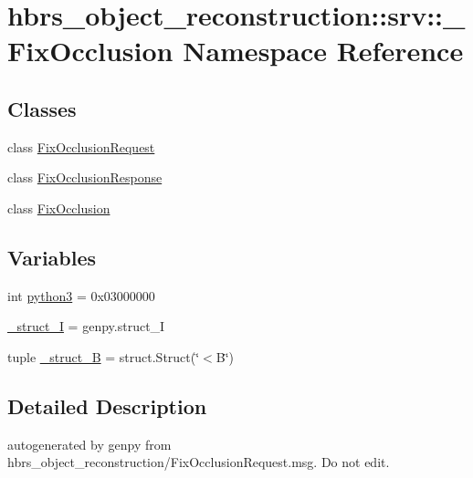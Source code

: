 \hypertarget{namespacehbrs__object__reconstruction_1_1srv_1_1___fix_occlusion}{\section{hbrs\-\_\-object\-\_\-reconstruction\-:\-:srv\-:\-:\-\_\-\-Fix\-Occlusion \-Namespace \-Reference}
\label{namespacehbrs__object__reconstruction_1_1srv_1_1___fix_occlusion}
}
\subsection*{\-Classes}
\begin{DoxyCompactItemize}
\item 
class \hyperlink{classhbrs__object__reconstruction_1_1srv_1_1___fix_occlusion_1_1_fix_occlusion_request}{\-Fix\-Occlusion\-Request}
\item 
class \hyperlink{classhbrs__object__reconstruction_1_1srv_1_1___fix_occlusion_1_1_fix_occlusion_response}{\-Fix\-Occlusion\-Response}
\item 
class \hyperlink{classhbrs__object__reconstruction_1_1srv_1_1___fix_occlusion_1_1_fix_occlusion}{\-Fix\-Occlusion}
\end{DoxyCompactItemize}
\subsection*{\-Variables}
\begin{DoxyCompactItemize}
\item 
int \hyperlink{namespacehbrs__object__reconstruction_1_1srv_1_1___fix_occlusion_a4c7dad148898433b90e5ae9472683363}{python3} = 0x03000000
\item 
\hyperlink{namespacehbrs__object__reconstruction_1_1srv_1_1___fix_occlusion_ad3570bc8f60a668990d4ae9e5f95aade}{\-\_\-struct\-\_\-\-I} = genpy.\-struct\-\_\-\-I
\item 
tuple \hyperlink{namespacehbrs__object__reconstruction_1_1srv_1_1___fix_occlusion_a566343094ecffe63a9af35eff0d7bc70}{\-\_\-struct\-\_\-\-B} = struct.\-Struct(\char`\"{}$<$\-B\char`\"{})
\end{DoxyCompactItemize}


\subsection{\-Detailed \-Description}
\begin{DoxyVerb}autogenerated by genpy from hbrs_object_reconstruction/FixOcclusionRequest.msg. Do not edit.\end{DoxyVerb}
 

